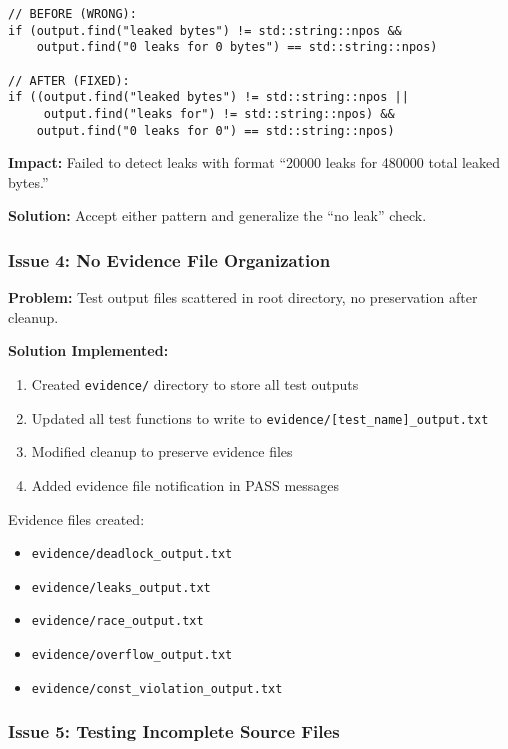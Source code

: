 \documentclass[11pt,a4paper]{article}
\begin{document}
\begin{lstlisting}[style=cpp]
// BEFORE (WRONG):
if (output.find("leaked bytes") != std::string::npos &&
    output.find("0 leaks for 0 bytes") == std::string::npos)

// AFTER (FIXED):
if ((output.find("leaked bytes") != std::string::npos ||
     output.find("leaks for") != std::string::npos) &&
    output.find("0 leaks for 0") == std::string::npos)
\end{lstlisting}

\textbf{Impact:} Failed to detect leaks with format ``20000 leaks for 480000 total leaked bytes.''

\textbf{Solution:} Accept either pattern and generalize the ``no leak'' check.

\subsubsection{Issue 4: No Evidence File Organization}

\textbf{Problem:} Test output files scattered in root directory, no preservation after cleanup.

\textbf{Solution Implemented:}
\begin{enumerate}
    \item Created \texttt{evidence/} directory to store all test outputs
    \item Updated all test functions to write to \texttt{evidence/[test\_name]\_output.txt}
    \item Modified cleanup to preserve evidence files
    \item Added evidence file notification in PASS messages
\end{enumerate}

Evidence files created:
\begin{itemize}
    \item \texttt{evidence/deadlock\_output.txt}
    \item \texttt{evidence/leaks\_output.txt}
    \item \texttt{evidence/race\_output.txt}
    \item \texttt{evidence/overflow\_output.txt}
    \item \texttt{evidence/const\_violation\_output.txt}
\end{itemize}

\subsubsection{Issue 5: Testing Incomplete Source Files}
\end{document}
